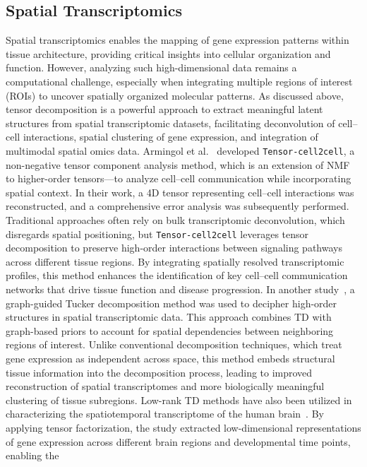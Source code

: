 \subsection{Spatial Transcriptomics}\label{sec:td_spatial}

Spatial transcriptomics enables the mapping of gene expression patterns within tissue architecture, providing critical insights into cellular organization and function. However, analyzing such high-dimensional data remains a computational challenge, especially when integrating multiple regions of interest (ROIs) to uncover spatially organized molecular patterns. As discussed above, tensor decomposition is a powerful approach to extract meaningful latent structures from spatial transcriptomic datasets, facilitating deconvolution of cell–cell interactions, spatial clustering of gene expression, and integration of multimodal spatial omics data. Armingol et al.~\cite{armingol2022context} developed \texttt{Tensor-cell2cell}, a non-negative tensor component analysis method, which is an extension of NMF to higher-order tensors—to analyze cell–cell communication while incorporating spatial context. In their work, a 4D tensor representing cell–cell interactions was reconstructed, and a comprehensive error analysis was subsequently performed. Traditional approaches often rely on bulk transcriptomic deconvolution, which disregards spatial positioning, but \texttt{Tensor-cell2cell} leverages tensor decomposition to preserve high-order interactions between signaling pathways across different tissue regions. By integrating spatially resolved transcriptomic profiles, this method enhances the identification of key cell–cell communication networks that drive tissue function and disease progression. In another study~\cite{broadbent2024deciphering}, a graph-guided Tucker decomposition method was used to decipher high-order structures in spatial transcriptomic data. This approach combines TD with graph-based priors to account for spatial dependencies between neighboring regions of interest. Unlike conventional decomposition techniques, which treat gene expression as independent across space, this method embeds structural tissue information into the decomposition process, leading to improved reconstruction of spatial transcriptomes and more biologically meaningful clustering of tissue subregions. Low-rank TD methods have also been utilized in characterizing the spatiotemporal transcriptome of the human brain~\cite{liu2017characterizing}. By applying tensor factorization, the study extracted low-dimensional representations of gene expression across different brain regions and developmental time points, enabling the 